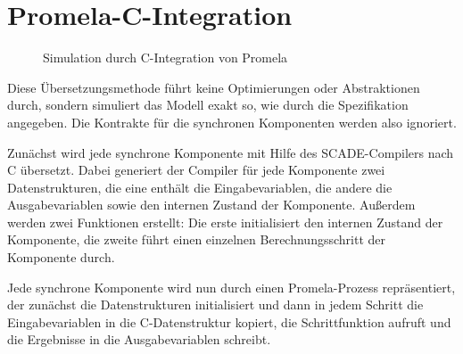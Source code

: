 \section{Promela-C-Integration}
\begin{figure}
  \centering
  \caption{Simulation durch C-Integration von Promela}
\end{figure}

Diese Übersetzungsmethode führt keine Optimierungen oder Abstraktionen durch, sondern simuliert das Modell exakt so, wie durch die Spezifikation angegeben.
Die Kontrakte für die synchronen Komponenten werden also ignoriert.

Zunächst wird jede synchrone Komponente mit Hilfe des SCADE-Compilers nach C übersetzt.
Dabei generiert der Compiler für jede Komponente zwei Datenstrukturen, die eine enthält die Eingabevariablen, die andere die Ausgabevariablen sowie den internen Zustand der Komponente.
Außerdem werden zwei Funktionen erstellt:
Die erste initialisiert den internen Zustand der Komponente, die zweite führt einen einzelnen Berechnungsschritt der Komponente durch.

Jede synchrone Komponente wird nun durch einen Promela-Prozess repräsentiert, der zunächst die Datenstrukturen initialisiert und dann in jedem Schritt die Eingabevariablen in die C-Datenstruktur kopiert, die Schrittfunktion aufruft und die Ergebnisse in die Ausgabevariablen schreibt.
